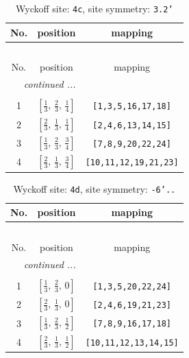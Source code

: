\documentclass[fleqn,8pt]{jsarticle}
\begin{document}
\renewcommand{\arraystretch}{1.2}
\begin{longtable}{ccc}
\caption{Wyckoff site: {\tt 4c}, site symmetry: {\tt 3.2'}}
 \\
 \hline \hline
No. & position & mapping \\ \hline \endfirsthead

\multicolumn{2}{l}{\tablename\ \thetable{}} \\
 \hline \hline
No. & position & mapping \\ \hline \endhead

 \hline \hline
\multicolumn{2}{r}{\footnotesize\it continued ...} \\ \endfoot

 \hline \hline
\multicolumn{2}{r}{} \\ \endlastfoot

1 & $\left[ \frac{1}{3},\, \frac{2}{3},\, \frac{1}{4} \right]$ & {\tt [1,3,5,16,17,18]} \\ \hline
2 & $\left[ \frac{2}{3},\, \frac{1}{3},\, \frac{1}{4} \right]$ & {\tt [2,4,6,13,14,15]} \\ \hline
3 & $\left[ \frac{1}{3},\, \frac{2}{3},\, \frac{3}{4} \right]$ & {\tt [7,8,9,20,22,24]} \\ \hline
4 & $\left[ \frac{2}{3},\, \frac{1}{3},\, \frac{3}{4} \right]$ & {\tt [10,11,12,19,21,23]} \\
\end{longtable}
\renewcommand{\arraystretch}{1.2}
\begin{longtable}{ccc}
\caption{Wyckoff site: {\tt 4d}, site symmetry: {\tt -6'..}}
 \\
 \hline \hline
No. & position & mapping \\ \hline \endfirsthead

\multicolumn{2}{l}{\tablename\ \thetable{}} \\
 \hline \hline
No. & position & mapping \\ \hline \endhead

 \hline \hline
\multicolumn{2}{r}{\footnotesize\it continued ...} \\ \endfoot

 \hline \hline
\multicolumn{2}{r}{} \\ \endlastfoot

1 & $\left[ \frac{1}{3},\, \frac{2}{3},\, 0 \right]$ & {\tt [1,3,5,20,22,24]} \\ \hline
2 & $\left[ \frac{2}{3},\, \frac{1}{3},\, 0 \right]$ & {\tt [2,4,6,19,21,23]} \\ \hline
3 & $\left[ \frac{1}{3},\, \frac{2}{3},\, \frac{1}{2} \right]$ & {\tt [7,8,9,16,17,18]} \\ \hline
4 & $\left[ \frac{2}{3},\, \frac{1}{3},\, \frac{1}{2} \right]$ & {\tt [10,11,12,13,14,15]} \\
\end{longtable}
\end{document}

